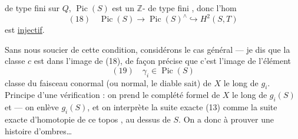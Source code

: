 de type fini sur $Q$, $\operatorname{Pic}(S)$ est un $\mathbb Z$- de type fini , donc l'hom
\[
(18)\quad \operatorname{Pic}(S)\longrightarrow\operatorname{Pic}(S)^\wedge\hookrightarrow H^2(S,T)
\]
est \uline{injectif}.

Sans nous soucier de cette condition,  considérons le cas général --- je dis que la classe  $c$  est dans l'image de (18), de façon précise que c'est l'image de l'élément
\[
(19)\quad \gamma_i\in\operatorname{Pic}(S)
\]
classe du faisceau conormal (ou normal, le diable sait) de $X$ le long de $g_i$. Principe d'une vérification : on prend le complété formel de $X$ le long de $g_i(S)$ et   --- on enlève $g_i(S)$, et on interprète la suite exacte (13) comme la suite exacte d'homotopie de ce  topos , au dessus de  $S$. On a donc à prouver une histoire d'ombres\dots
{}
